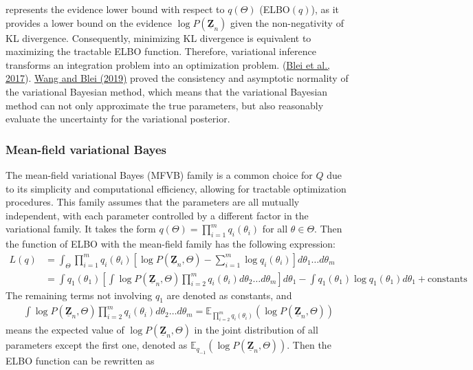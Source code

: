 \documentclass[12pt,a4paper]{article}
\begin{document}
represents the evidence lower bound with respect to $q(\Theta)$ (ELBO$(q)$), as it provides a lower bound on the evidence $\log P(\underline{\mathbf{Z}}_n)$ given the non-negativity of KL divergence. Consequently, minimizing KL divergence is equivalent to maximizing the tractable ELBO function. Therefore, variational inference transforms an integration problem into an optimization problem. (\hyperref[blei2017]{Blei et al., 2017}). \hyperref[wang2019]{Wang and Blei (2019)} proved the consistency and asymptotic normality of the variational Bayesian method, which means that the variational Bayesian method can not only approximate the true parameters, but also reasonably evaluate the uncertainty for the variational posterior.

\subsubsection{Mean-field variational Bayes}
The mean-field variational Bayes (MFVB) family is a common choice for $Q$ due to its simplicity and computational efficiency, allowing for tractable optimization procedures. This family assumes that the parameters are all mutually independent, with each parameter controlled by a different factor in the variational family. It takes the form $q(\Theta) = \prod_{i=1}^{m} q_i(\theta_i)$ for all $\theta \in \Theta$. Then the function of ELBO with the mean-field family has the following expression:
\begin{align*}
L(q) &= \int_{\Theta} \prod_{i=1}^{m} q_i(\theta_i) \left[\log P(\underline{\mathbf{Z}}_n, \Theta)- \sum_{i=1}^{m} \log q_i(\theta_i) \right] d\theta_1 \ldots d\theta_m\\
&=\int q_1(\theta_1)\left[\int \log P(\underline{\mathbf{Z}}_n, \Theta) \prod_{i=2}^{m} q_i(\theta_i) d\theta_2 \ldots d\theta_m \right]d\theta_1
-\int q_1(\theta_1) \log q_1(\theta_1)d\theta_1 + \text{constants}
\end{align*}
The remaining terms not involving $q_1$ are denoted as constants, and
\begin{align*}
\int \log P(\underline{\mathbf{Z}}_n, \Theta) \prod_{i=2}^{m} q_i(\theta_i) d\theta_2 \ldots d\theta_m = \mathbb{E}_{\prod_{i=2}^{m} q_i(\theta_i)}(\log P(\underline{\mathbf{Z}}_n, \Theta))
\end{align*}
means the expected value of $\log P(\underline{\mathbf{Z}}_n, \Theta)$ in the joint distribution of all parameters except the first one, denoted as $\mathbb{E}_{q_{-1}}(\log P(\underline{\mathbf{Z}}_n, \Theta))$. Then the ELBO function can be rewritten as
\end{document}
